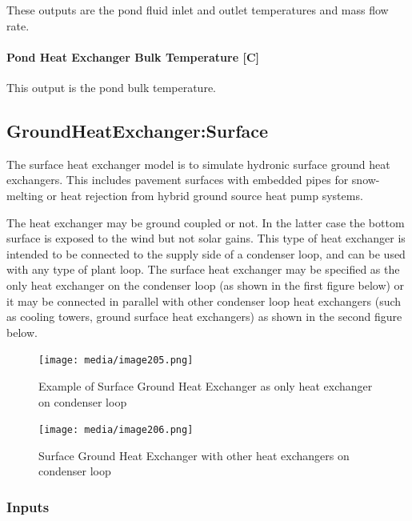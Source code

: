 These outputs are the pond fluid inlet and outlet temperatures and mass flow rate.

\paragraph{Pond Heat Exchanger Bulk Temperature {[}C{]}}\label{pond-heat-exchanger-bulk-temperature-c}

This output is the pond bulk temperature.

\subsection{GroundHeatExchanger:Surface}\label{groundheatexchangersurface}

The surface heat exchanger model is to simulate hydronic surface ground heat exchangers. This includes pavement surfaces with embedded pipes for snow-melting or heat rejection from hybrid ground source heat pump systems.

The heat exchanger may be ground coupled or not. In the latter case the bottom surface is exposed to the wind but not solar gains. This type of heat exchanger is intended to be connected to the supply side of a condenser loop, and can be used with any type of plant loop. The surface heat exchanger may be specified as the only heat exchanger on the condenser loop (as shown in the first figure below) or it may be connected in parallel with other condenser loop heat exchangers (such as cooling towers, ground surface heat exchangers) as shown in the second figure below.

\begin{figure}[hbtp] %
\centering
\texttt{[image: media/image205.png]}
\caption{Example of Surface Ground Heat Exchanger as only heat exchanger on condenser loop \protect \label{fig:example-of-surface-ground-heat-exchanger}}
\end{figure}

\begin{figure}[hbtp] %
\centering
\texttt{[image: media/image206.png]}
\caption{Surface Ground Heat Exchanger with other heat exchangers on condenser loop \protect \label{fig:surface-ground-heat-exchanger-with-other-heat}}
\end{figure}

\subsubsection{Inputs}\label{inputs-13-002}

